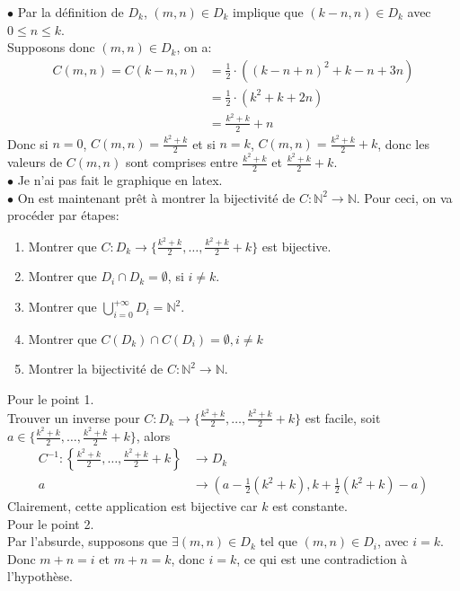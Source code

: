 \documentclass[11pt, a4paper]{article}
\begin{document}
		$\bullet$ Par la définition de $D_k$, $(m,n) \in D_k$ implique que $(k-n,n)\in D_k$ avec $0\leq n\leq k$.\\
		Supposons donc $(m,n) \in D_k$, on a:
		\begin{align*}
			C(m,n)=C(k-n,n)&= \frac{1}{2} \cdot \left( (k-n+n)^{2} + k-n + 3n\right)\\
				       &= \frac{1}{2} \cdot \left( k^{2} + k + 2n\right)\\
				       &= \frac{k^{2}+k}{2} + n
		\end{align*}
		Donc si $n=0$, $C(m,n)= \frac{k^{2}+k}{2}$ et si $n=k$, $C(m,n)= \frac{k^{2}+k}{2}+k$, donc les valeurs de $C(m,n)$ sont comprises entre $\frac{k^{2}+k}{2}$ et  $\frac{k^{2}+k}{2}+k$.\\
		$\bullet$ Je n'ai pas fait le graphique en latex.\\
		$\bullet$ On est maintenant prêt à montrer la bijectivité de $C: \mathbb{N}^{2} \to \mathbb{N}$.
		Pour ceci, on va procéder par étapes:
		\begin{enumerate}
			\item Montrer que $C:D_k \to \{\frac{k^{2}+k}{2},\ldots,\frac{k^{2}+k}{2}+k\}$ est bijective.
			\item Montrer que $ D_i \cap D_k= \emptyset$, si $i\neq k$.
			\item Montrer que $\bigcup_{i=0}^{+\infty} D_i = \mathbb{N}^{2}$.
			\item Montrer que $C(D_k)\cap C(D_i) = \emptyset, i \neq k$
			\item Montrer la bijectivité de $C: \mathbb{N}^{2} \to \mathbb{N}$.
		\end{enumerate}
		Pour le point 1.\\
		Trouver un inverse pour $C:D_k \to \{\frac{k^{2}+k}{2},\ldots,\frac{k^{2}+k}{2}+k\}$ est facile, soit $a \in \{\frac{k^{2}+k}{2},\ldots,\frac{k^{2}+k}{2}+k\}$, alors
		\begin{align*}
			C^{-1}: \left\{\frac{k^{2}+k}{2},\ldots,\frac{k^{2}+k}{2}+k\right\} &\to D_k\\
			a &\to \left(a-\frac{1}{2}(k^{2}+k),k+\frac{1}{2}(k^{2}+k)-a\right)
		\end{align*}
		Clairement, cette application est bijective car $k$ est constante.\\
		Pour le point 2.\\
		Par l'absurde, supposons que $\exists (m,n) \in D_k$ tel que $(m,n) \in D_i$, avec $i=k$.\\
		Donc $m+n=i$ et $m+n=k$, donc $i=k$, ce qui est une contradiction à l'hypothèse.\\
\end{document}
